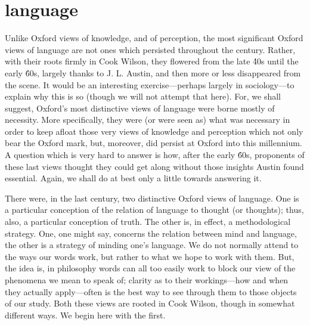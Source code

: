 \section{language} %
\label{sec:language}

Unlike Oxford views of knowledge, and of perception, the most significant Oxford views of language are not ones which persisted throughout the century. Rather, with their roots firmly in Cook Wilson, they flowered from the late \'40s until the early \'60s, largely thanks to J. L. Austin, and then more or less disappeared from the scene. It would be an interesting exercise---perhaps largely in sociology---to explain why this is so (though we will not attempt that here). For, we shall suggest, Oxford’s most distinctive views of language were borne mostly of necessity. More specifically, they were (or were seen as) what was necessary in order to keep afloat those very views of knowledge and perception which not only bear the Oxford mark, but, moreover, did persist at Oxford into this millennium. A question which is very hard to answer is how, after the early \'60s, proponents of these last views thought they could get along without those insights Austin found essential. Again, we shall do at best only a little towards answering it.

There were, in the last century, two distinctive Oxford views of language. One is a particular conception of the relation of language to thought (or thoughts); thus, also, a particular conception of truth. The other is, in effect, a methodological strategy. One, one might say, concerns the relation between mind and language, the other is a strategy of minding one’s language. We do not normally attend to the ways our words work, but rather to what we hope to work with them. But, the idea is, in philosophy words can all too easily work to block our view of the phenomena we mean to speak of; clarity as to their workings—how and when they actually apply---often is the best way to see through them to those objects of our study. Both these views are rooted in Cook Wilson, though in somewhat different ways. We begin here with the first.


